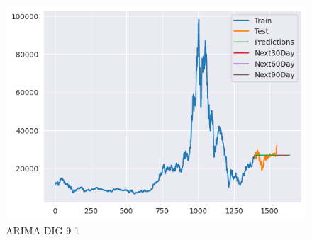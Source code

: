 \documentclass[conference]{IEEEtran}
\begin{document}
\begin{figure}[htbp]
\begin{minipage}{0.23\textwidth}
    \end{minipage}
    \begin{minipage}{0.23\textwidth}
    \centering
    \includegraphics[width=1\textwidth]{experiment/arima/DIG/9 _ 1/9_1_train_test_DIG_ARIMA_plot.png}
    \caption{ARIMA DIG 9-1}
    \label{fig:nvl_histogram}
    \end{minipage}

    \vspace{0.5cm} %


\end{figure}
\end{document}
